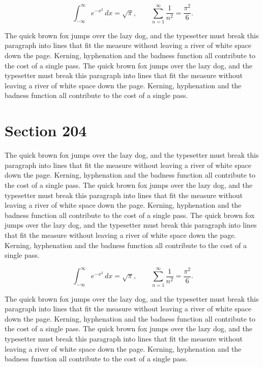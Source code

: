 \documentclass{article}
\begin{document}
\begin{equation}
\int_{-\infty}^{\infty} e^{-x^{2}}\,dx = \sqrt{\pi}, \qquad
\sum_{n=1}^{\infty} \frac{1}{n^{2}} = \frac{\pi^{2}}{6}.
\end{equation}

The quick brown fox jumps over the lazy dog, and the typesetter must break this paragraph into lines that fit the measure without leaving a river of white space down the page. Kerning, hyphenation and the badness function all contribute to the cost of a single pass. The quick brown fox jumps over the lazy dog, and the typesetter must break this paragraph into lines that fit the measure without leaving a river of white space down the page. Kerning, hyphenation and the badness function all contribute to the cost of a single pass. 
\section{Section 204}
The quick brown fox jumps over the lazy dog, and the typesetter must break this paragraph into lines that fit the measure without leaving a river of white space down the page. Kerning, hyphenation and the badness function all contribute to the cost of a single pass. The quick brown fox jumps over the lazy dog, and the typesetter must break this paragraph into lines that fit the measure without leaving a river of white space down the page. Kerning, hyphenation and the badness function all contribute to the cost of a single pass. The quick brown fox jumps over the lazy dog, and the typesetter must break this paragraph into lines that fit the measure without leaving a river of white space down the page. Kerning, hyphenation and the badness function all contribute to the cost of a single pass. 

\begin{equation}
\int_{-\infty}^{\infty} e^{-x^{2}}\,dx = \sqrt{\pi}, \qquad
\sum_{n=1}^{\infty} \frac{1}{n^{2}} = \frac{\pi^{2}}{6}.
\end{equation}

The quick brown fox jumps over the lazy dog, and the typesetter must break this paragraph into lines that fit the measure without leaving a river of white space down the page. Kerning, hyphenation and the badness function all contribute to the cost of a single pass. The quick brown fox jumps over the lazy dog, and the typesetter must break this paragraph into lines that fit the measure without leaving a river of white space down the page. Kerning, hyphenation and the badness function all contribute to the cost of a single pass. 
\end{document}
